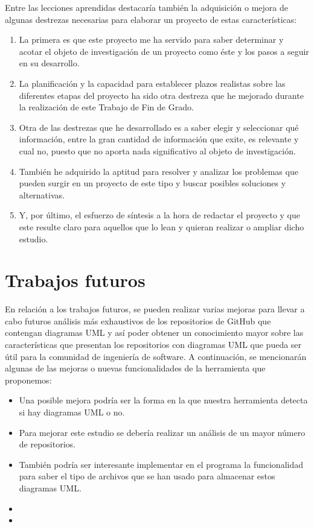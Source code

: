 \documentclass[a4paper, 12pt]{book}
\begin{document}
Entre las lecciones aprendidas destacaría también la adquisición o mejora de algunas destrezas necesarias para elaborar un proyecto de estas características:
\begin{enumerate}
  \item  La primera es que este proyecto me ha servido para saber determinar y acotar el objeto de investigación de un proyecto como éste y los pasos a seguir en su desarrollo.
  \item  La planificación y la capacidad para establecer plazos realistas sobre las diferentes etapas del proyecto ha sido otra destreza que he mejorado durante la realización de este Trabajo de Fin de Grado.
  \item  Otra de las destrezas que he desarrollado es a saber elegir y seleccionar qué información, entre la gran cantidad de información que exite, es relevante y cual no, puesto que no aporta nada significativo al objeto de investigación.
  \item  También he adquirido la aptitud para resolver y analizar los problemas que pueden surgir en un proyecto de este tipo y buscar posibles soluciones y alternativas.  
  \item  Y, por último, el esfuerzo de síntesis a la hora de redactar el proyecto y que este resulte claro para aquellos que lo lean y quieran realizar o ampliar dicho estudio. 
\end{enumerate}

\section{Trabajos futuros}
\label{sec:trabajos_futuros}


En relación a los trabajos futuros, se pueden realizar varias mejoras para llevar a cabo futuros análisis más exhaustivos de los repositorios de GitHub que contengan diagramas UML y así poder obtener un conocimiento mayor sobre las características que presentan los repositorios con diagramas UML que pueda ser útil para la comunidad de ingeniería de software. 
A continuación, se mencionarán algunas de las mejoras o nuevas funcionalidades de la herramienta que proponemos:

\begin{itemize}
  \item  Una posible mejora podría ser la forma en la que nuestra herramienta detecta si hay diagramas UML o no.
  \item  Para mejorar este estudio se debería realizar un análisis de un mayor número de repositorios.
  \item  También podría ser interesante implementar en el programa la funcionalidad para saber el tipo de archivos que se han usado para almacenar estos diagramas UML.
  \item    
  \item 
\end{itemize}
\end{document}
